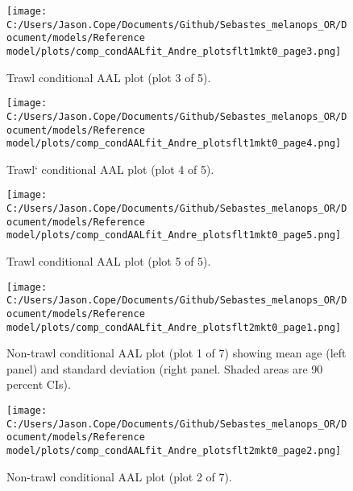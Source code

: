 \documentclass[11pt,
  letterpaper,
]{article}
\begin{document}
\begin{figure}
{\centering
\texttt{[image: C:/Users/Jason.Cope/Documents/Github/Sebastes\_melanops\_OR/Document/models/Reference model/plots/comp\_condAALfit\_Andre\_plotsflt1mkt0\_page3.png]}
}
\caption{Trawl conditional AAL plot (plot 3 of 5).\label{fig:comp_condAALfit_Andre_plotsflt1mkt0_page3}}
\end{figure}

\begin{figure}
{\centering
\texttt{[image: C:/Users/Jason.Cope/Documents/Github/Sebastes\_melanops\_OR/Document/models/Reference model/plots/comp\_condAALfit\_Andre\_plotsflt1mkt0\_page4.png]}
}
\caption{Trawl` conditional AAL plot (plot 4 of 5).\label{fig:comp_condAALfit_Andre_plotsflt1mkt0_page4}}
\end{figure}

\begin{figure}
{\centering
\texttt{[image: C:/Users/Jason.Cope/Documents/Github/Sebastes\_melanops\_OR/Document/models/Reference model/plots/comp\_condAALfit\_Andre\_plotsflt1mkt0\_page5.png]}
}
\caption{Trawl conditional AAL plot (plot 5 of 5).\label{fig:comp_condAALfit_Andre_plotsflt1mkt0_page5}}
\end{figure}

\begin{figure}
{\centering
\texttt{[image: C:/Users/Jason.Cope/Documents/Github/Sebastes\_melanops\_OR/Document/models/Reference model/plots/comp\_condAALfit\_Andre\_plotsflt2mkt0\_page1.png]}
}
\caption{Non-trawl conditional AAL plot (plot 1 of 7) showing mean age (left panel) and standard deviation (right panel. Shaded areas are 90 percent CIs).\label{fig:comp_condAALfit_Andre_plotsflt2mkt0_page1}}
\end{figure}

\begin{figure}
{\centering
\texttt{[image: C:/Users/Jason.Cope/Documents/Github/Sebastes\_melanops\_OR/Document/models/Reference model/plots/comp\_condAALfit\_Andre\_plotsflt2mkt0\_page2.png]}
}
\caption{Non-trawl conditional AAL plot (plot 2 of 7).\label{fig:comp_condAALfit_Andre_plotsflt2mkt0_page2}}
\end{figure}
\end{document}
